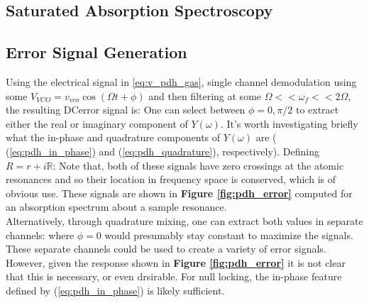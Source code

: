 \subsection{Saturated Absorption Spectroscopy}


\subsection{Error Signal Generation}

Using the electrical signal in \ref{eq:v_pdh_gas}, single channel demodulation using some $V_{VCO} = v_{vco}\cos(\Omega t+ \phi)$ and then filtering at some $\Omega << \omega_f << 2\Omega$, the resulting DCerror signal is:
\ggather{
  \epsilon \propto \Re[Y(\omega)]\cos\phi + \Im[Y(\omega)]\sin\phi
}
One can select between $\phi = 0, \pi/2$ to extract either the real or imaginary component of $Y(\omega)$. It's worth investigating briefly what the in-phase and quadrature components of $Y(\omega)$ are ( (\ref{eq:pdh_in_phase}) and (\ref{eq:pdh_quadrature}), respectively). Defining $R = r + i\mathbb{R}$:
Note that, both of these signals have zero crossings at the atomic resonances and so their location in frequency space is conserved, which is of obvious use. These signals are shown in \textbf{Figure \ref{fig:pdh_error}} computed for an absorption spectrum about a sample resonance. \\

Alternatively, through quadrature mixing, one can extract both values in separate channels:
where $\phi=0$ would presumably stay constant to maximize the signals. These separate channels could be used to create a variety of error signals. However, given the response shown in \textbf{Figure \ref{fig:pdh_error}} it is not clear that this is necessary, or even drsirable. For null locking, the in-phase feature defined by (\ref{eq:pdh_in_phase}) is likely sufficient.

